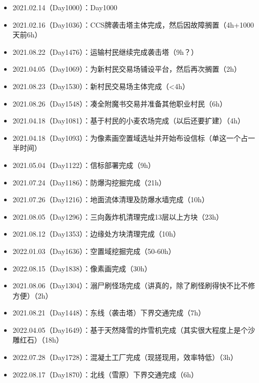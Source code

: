 \documentclass[openany]{book}
\theoremstyle{remark}\newtheorem*{remark}{Remark}
\begin{document}
	\begin{itemize}
		\item 2021.02.14（Day1000）：Day1000
		\item 2021.02.16（Day1036）：CCS牌袭击塔主体完成，然后因故障搁置（4h+1000天前6h）
		\item 2021.08.22（Day1476）：运输村民继续完成袭击塔（9h？）
		\item 2021.04.05（Day1069）：为新村民交易场铺设平台，然后再次搁置（2h）
		\item 2021.08.23（Day1530）：新村民交易场主体完成（<4h）
		\item 2021.08.26（Day1548）：凑全附魔书交易并准备其他职业村民（6h）
		\item 2021.04.18（Day1081）：基于村民的小麦农场完成（以后还要扩建）（4h）
		\item 2021.04.18（Day1093）：为像素画空置域选址并开始布设信标（单这一个占一半时间）
		\item 2021.05.04（Day1122）：信标部署完成（9h）
		\item 2021.07.24（Day1186）：防爆沟挖掘完成（21h）
		\item 2021.07.26（Day1216）：地面流体清理及防爆水墙完成（10h）
		\item 2021.08.05（Day1296）：三向轰炸机清理完成13层以上方块（23h）
		\item 2021.08.12（Day1353）：边缘处方块清理完成（10h）
		\item 2022.01.03（Day1636）：空置域挖掘完成（50-60h）
		\item 2022.08.15（Day1838）：像素画完成（30h）
		\item 2021.08.06（Day1304）：溺尸刷怪场完成（讲真的，除了刷怪刷得快不比不修方便）（2h）
		\item 2021.08.21（Day1448）：东线（袭击塔）下界交通完成（7h）
		\item 2022.04.05（Day1649）：基于天然降雪的炸雪机完成（其实很大程度上是个沙雕红石）（18h）
		\item 2022.07.28（Day1728）：混凝土工厂完成（现搓现用，效率特低）（3h）
		\item 2022.08.17（Day1870）：北线（雪原）下界交通完成（6h）
	\end{itemize}
	
\end{document}
